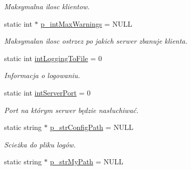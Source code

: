 \begin{DoxyCompactItemize}
\begin{DoxyCompactList}\small\item\em Maksymalna ilosc klientow. \item\end{DoxyCompactList}\item 
\hypertarget{classServerConfigs_a430ce54c5e6da45788eabf7abae43ced}{
static int $\ast$ \hyperlink{classServerConfigs_a430ce54c5e6da45788eabf7abae43ced}{p\_\-intMaxWarnings} = NULL}
\label{classServerConfigs_a430ce54c5e6da45788eabf7abae43ced}

\begin{DoxyCompactList}\small\item\em Maksymalan ilosc ostrzez po jakich serwer zbanuje klienta. \item\end{DoxyCompactList}\item 
\hypertarget{classServerConfigs_a3c93e632afec4434ee4bba607c4258cf}{
static int \hyperlink{classServerConfigs_a3c93e632afec4434ee4bba607c4258cf}{intLoggingToFile} = 0}
\label{classServerConfigs_a3c93e632afec4434ee4bba607c4258cf}

\begin{DoxyCompactList}\small\item\em Informacja o logowaniu. \item\end{DoxyCompactList}\item 
\hypertarget{classServerConfigs_a1d5ee582c4eed5b579fb9beb1e973472}{
static int \hyperlink{classServerConfigs_a1d5ee582c4eed5b579fb9beb1e973472}{intServerPort} = 0}
\label{classServerConfigs_a1d5ee582c4eed5b579fb9beb1e973472}

\begin{DoxyCompactList}\small\item\em Port na którym serwer będzie nasłuchiwać. \item\end{DoxyCompactList}\item 
\hypertarget{classServerConfigs_a60d8f33244a4b2dd862aea73162f827c}{
static string $\ast$ \hyperlink{classServerConfigs_a60d8f33244a4b2dd862aea73162f827c}{p\_\-strConfigPath} = NULL}
\label{classServerConfigs_a60d8f33244a4b2dd862aea73162f827c}

\begin{DoxyCompactList}\small\item\em Scieżka do pliku logów. \item\end{DoxyCompactList}\item 
\hypertarget{classServerConfigs_abe785e74a7d0891434c1ba47a80322a2}{
static string $\ast$ \hyperlink{classServerConfigs_abe785e74a7d0891434c1ba47a80322a2}{p\_\-strMyPath} = NULL}
\label{classServerConfigs_abe785e74a7d0891434c1ba47a80322a2}


\end{DoxyCompactItemize}
